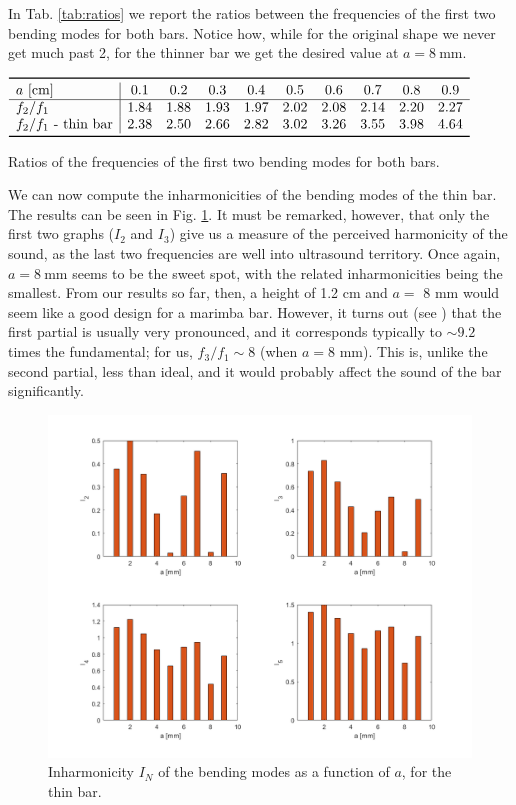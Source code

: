 \documentclass[a4paper]{article}
\begin{document}
In Tab. \ref{tab:ratios} we report the ratios between the frequencies of the first two bending modes for both bars. Notice how, while for the original shape we never get much past 2, for the thinner bar we get the desired value at $a=8~\si{\milli\meter}$. 

\begin{table}[h]
	\centering
	$\begin{array}{l|ccccccccc}
		\toprule
		a~[\si{\centi\meter}] & 0.1 & 0.2 & 0.3 & 0.4 & 0.5 & 0.6 & 0.7 & 0.8 & 0.9\\
		\hline
		f_2/f_1 & 1.84 & 1.88 & 1.93 & 1.97 & 2.02 & 2.08 & 2.14 & 2.20 & 2.27 \\
		f_2/f_1 \text{ - thin bar} & 2.38 & 2.50 & 2.66 & 2.82 & 3.02 & 3.26 & 3.55 & 3.98 & 4.64 \\
		\bottomrule
	\end{array}$
	\caption{Ratios of the frequencies of the first two bending modes for both bars.}
	\label{tab:ratios}
\end{table}

We can now compute the inharmonicities of the bending modes of the thin bar. The results can be seen in Fig. \ref{fig:thinharm}. It must be remarked, however, that only the first two graphs ($I_2$ and $I_3$) give us a measure of the perceived harmonicity of the sound, as the last two frequencies are well into ultrasound territory. Once again, $a=8~\si{\milli\meter}$ seems to be the sweet spot, with the related inharmonicities being the smallest. From our results so far, then, a height of  1.2 cm and $a =$ 8 mm would seem like a good design for a marimba bar. However, it turns out (see \cite{fletchross}) that the first partial is usually very pronounced, and it corresponds typically to $\sim 9.2$ times the fundamental; for us, $f_3/f_1 \sim 8$ (when $a=8$ mm). This is, unlike the second partial, less than ideal, and it would probably affect the sound of the bar significantly.

\begin{figure}[h]
	\centering
	\includegraphics[width=0.85\linewidth]{thinharm.png}
	\caption{Inharmonicity $I_N$ of the bending modes as a function of $a$, for the thin bar.}
	\label{fig:thinharm}
\end{figure}



\printbibliography
\end{document}
